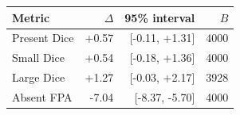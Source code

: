 \par\medskip\noindent\begin{minipage}{\linewidth}
\captionsetup{type=table}
\centering
\caption{Paired query-slide bootstrap with fixed model weights. Differences and 95\% intervals are FewClick minus SANSA in percentage points. $B$ is the number of retained replicates.}
\label{tab:bootstrap}
\small
\setlength{\tabcolsep}{4pt}
\begin{tabular}{@{}lrrr@{}}
\toprule
Metric & $\Delta$ & 95\% interval & $B$ \\
\midrule
Present Dice & +0.57 & [-0.11, +1.31] & 4000 \\
Small Dice & +0.54 & [-0.18, +1.36] & 4000 \\
Large Dice & +1.27 & [-0.03, +2.17] & 3928 \\
Absent FPA & -7.04 & [-8.37, -5.70] & 4000 \\
\bottomrule
\end{tabular}
\end{minipage}\par\medskip
